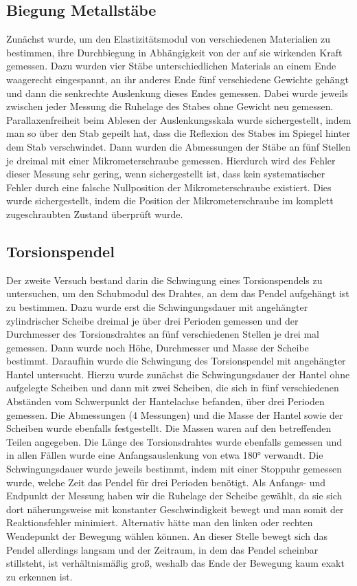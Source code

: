 \documentclass[
	a4paper,
	12pt,
	pagesize,
	ngerman
]{scrartcl}
\begin{document}
	\subsection{Biegung Metallstäbe} %
	Zunächst wurde, um den Elastizitätsmodul von verschiedenen Materialien zu bestimmen, ihre Durchbiegung in Abhängigkeit von der auf sie wirkenden Kraft gemessen. Dazu wurden vier Stäbe unterschiedlichen Materials an einem Ende waagerecht eingespannt, an ihr anderes Ende fünf verschiedene Gewichte gehängt und dann die senkrechte Auslenkung dieses Endes gemessen.
	Dabei wurde jeweils zwischen jeder Messung die Ruhelage des Stabes ohne Gewicht neu gemessen. Parallaxenfreiheit beim Ablesen der Auslenkungsskala wurde sichergestellt, indem man so über den Stab gepeilt hat, dass die Reflexion des Stabes im Spiegel hinter dem Stab verschwindet. %
	Dann wurden die Abmessungen der Stäbe an fünf Stellen je dreimal mit einer Mikrometerschraube  gemessen. Hierdurch wird des Fehler dieser Messung sehr gering, wenn sichergestellt ist, dass kein systematischer Fehler durch eine falsche Nullposition der Mikrometerschraube existiert. Dies wurde sichergestellt, indem die Position der Mikrometerschraube im komplett zugeschraubten Zustand überprüft wurde.
	
	\subsection{Torsionspendel}
	Der zweite Versuch bestand darin die Schwingung eines Torsionspendels zu untersuchen, um den Schubmodul des Drahtes, an dem das Pendel aufgehängt ist zu bestimmen. %
	 Dazu wurde erst die Schwingungsdauer mit angehängter zylindrischer Scheibe dreimal je über drei Perioden gemessen und der Durchmesser des Torsionsdrahtes an fünf verschiedenen Stellen je drei mal gemessen. Dann wurde noch Höhe, Durchmesser und Masse der Scheibe bestimmt.
	Daraufhin wurde die Schwingung des Torsionspendel mit angehängter Hantel untersucht. Hierzu wurde zunächst die Schwingungsdauer der Hantel ohne aufgelegte Scheiben und dann mit zwei Scheiben, die sich in fünf verschiedenen Abständen vom Schwerpunkt der Hantelachse befanden, über drei Perioden gemessen. Die Abmessungen (4 Messungen) und die Masse der Hantel sowie der Scheiben wurde ebenfalls festgestellt. Die Massen waren auf den betreffenden Teilen angegeben.
	Die Länge des Torsionsdrahtes wurde ebenfalls gemessen und in allen Fällen wurde eine Anfangsauslenkung von etwa 180° verwandt. Die Schwingungsdauer wurde jeweils bestimmt, indem mit einer Stoppuhr gemessen wurde, welche Zeit das Pendel für drei Perioden benötigt. Als Anfangs- und Endpunkt der Messung haben wir die Ruhelage der Scheibe gewählt, da sie sich dort näherungsweise mit konstanter Geschwindigkeit bewegt und man somit der Reaktionsfehler minimiert.
	Alternativ hätte man den linken oder rechten Wendepunkt der Bewegung wählen können. An dieser Stelle bewegt sich das Pendel allerdings langsam und der Zeitraum, in dem das Pendel scheinbar stillsteht, ist verhältnismäßig groß, weshalb das Ende der Bewegung kaum exakt zu erkennen ist.
	
\end{document}
